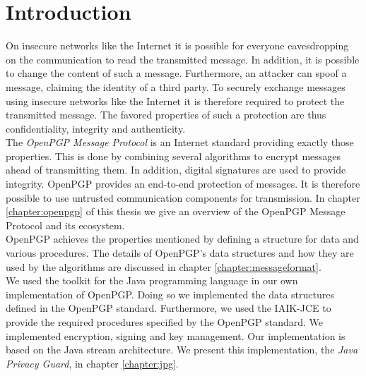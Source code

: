 \chapter{Introduction}



On insecure networks like the Internet it is possible for everyone eavesdropping on the communication to read the transmitted message. In addition, it is possible to change the content of such a message. Furthermore, an attacker can spoof a message, claiming the identity of a third party.
To securely exchange messages using insecure networks like the Internet it is therefore required to protect the transmitted message. The favored properties of such a protection are thus confidentiality, integrity and authenticity. \\


The \textit{OpenPGP Message Protocol} is an Internet standard providing exactly those properties.  This is done by combining several algorithms to encrypt messages ahead of transmitting them. In addition, digital signatures are used to provide integrity. OpenPGP provides an end-to-end protection of messages. It is therefore possible to use untrusted communication components for transmission.
In chapter \ref{chapter:openpgp} of this thesis we give an overview of the OpenPGP Message Protocol and its ecosystem. \\

OpenPGP achieves the properties mentioned by defining a structure for data and various procedures. The details of OpenPGP's data structures and how they are used by the algorithms are discussed in chapter \ref{chapter:messageformat}. \\


We used the  toolkit for the Java programming language in our own implementation of OpenPGP. Doing so we implemented the data structures defined in the OpenPGP standard. Furthermore, we used the IAIK-JCE to provide the required procedures specified by the OpenPGP standard. We implemented encryption, signing and key management. Our implementation is based on the Java stream architecture. We present this implementation, the \textit{Java Privacy Guard}, in chapter \ref{chapter:jpg}. \\

